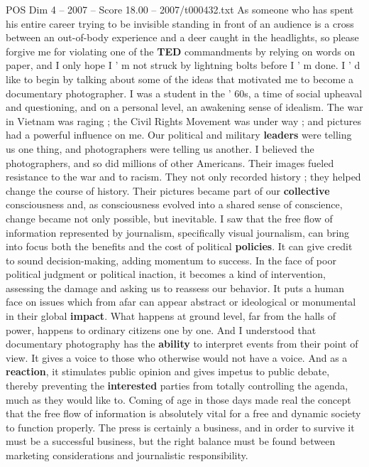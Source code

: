 \begin{textsample}{POS Dim 4 – 2007 – Score 18.00 – 2007/t000432.txt}  \label{ex:f4_pos_019}
As someone who has spent his entire career trying to be invisible standing in front of an audience is a cross between an out-of-body experience and a deer caught in the headlights, so please forgive me for violating one of the \textbf{TED} commandments by relying on words on paper, and I only hope I ' m not struck by lightning bolts before I ' m done.
I ' d like to begin by talking about some of the ideas that motivated me to become a documentary photographer.
I was a student in the ' 60s, a time of social upheaval and questioning, and on a personal level, an awakening sense of idealism.
The war in Vietnam was raging ; the Civil Rights Movement was under way ; and pictures had a powerful influence on me.
Our political and military \textbf{leaders} were telling us one thing, and photographers were telling us another.
I believed the photographers, and so did millions of other Americans.
Their images fueled resistance to the war and to racism.
They not only recorded history ; they helped change the course of history.
Their pictures became part of our \textbf{collective} consciousness and, as consciousness evolved into a shared sense of conscience, change became not only possible, but inevitable.
I saw that the free flow of information represented by journalism, specifically visual journalism, can bring into focus both the benefits and the cost of political \textbf{policies}.
It can give credit to sound decision-making, adding momentum to success.
In the face of poor political judgment or political inaction, it becomes a kind of intervention, assessing the damage and asking us to reassess our behavior.
It puts a human face on issues which from afar can appear abstract or ideological or monumental in their global \textbf{impact}.
What happens at ground level, far from the halls of power, happens to ordinary citizens one by one.
And I understood that documentary photography has the \textbf{ability} to interpret events from their point of view.
It gives a voice to those who otherwise would not have a voice.
And as a \textbf{reaction}, it stimulates public opinion and gives impetus to public debate, thereby preventing the \textbf{interested} parties from totally controlling the agenda, much as they would like to.
Coming of age in those days made real the concept that the free flow of information is absolutely vital for a free and dynamic society to function properly.
The press is certainly a business, and in order to survive it must be a successful business, but the right balance must be found between marketing considerations and journalistic responsibility.

\end{textsample}
